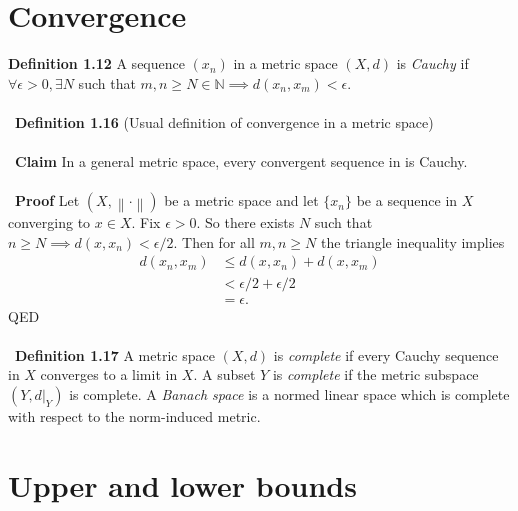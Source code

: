 \documentclass[12 pt]{article}
\newcommand{\N}{\mathbb{N}}
\newcommand{\nm}[1]{\left\| #1 \right\|}
\numberwithin{equation}{section}
\begin{document}
{\section{Convergence}


\textbf{Definition 1.12} A sequence $(x_n)$ in a metric space $(X, d)$ is \textit{Cauchy} if $\forall \epsilon > 0, \exists N$ such that $m, n \geq N \in \N \implies d(x_n, x_m) < \epsilon$.\\
\\
\
\textbf{Definition 1.16} (Usual definition of convergence in a metric space)\\
\\
\
\textbf{Claim} In a general metric space, every convergent sequence in is Cauchy.\\
\\
\
\textbf{Proof} Let $(X, \nm{\cdot})$ be a metric space and let $\{x_n\}$ be a sequence in $X$ converging to $x \in X$. Fix $\epsilon > 0$. So there exists $N$ such that $n \geq N \implies d(x, x_n) < \epsilon/2$. Then for all $m, n \geq N$ the triangle inequality implies \begin{align*}
d(x_n, x_m) & \leq d(x, x_n) + d(x, x_m) \\
\ & < \epsilon/2 + \epsilon / 2 \\
\ & = \epsilon.
\end{align*}
QED\\
\\
\
\textbf{Definition 1.17} A metric space $(X, d)$ is \textit{complete} if every Cauchy sequence in $X$ converges to a limit in $X$. A subset $Y$ is \textit{complete} if the metric subspace $(Y, d|_Y)$ is complete. A \textit{Banach space} is a normed linear space which is complete with respect to the norm-induced metric.















\section{Upper and lower bounds}

}
\end{document}
